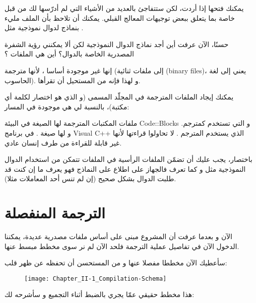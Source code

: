 يمكنك فتحها إذا أردت، لكن ستتفاجئ بالعديد من الأشياء التي لم أدرّسها لك من قبل خاصة بما يتعلق ببعض توجيهات المعالج القبلي. يمكنك أن تلاحظ بأن الملف مليء بنماذج لدوال نموذجية مثل
.

\begin{question}
  حسنًا، الآن عرفت أين أجد نماذج الدوال النموذجية لكن ألا يمكنني رؤية الشفرة المصدرية الخاصة بالدوال؟ أين هي الملفات
؟
\end{question}

إنها غير موجودة أساسا ، لأنها مترجمة (إلى ملفات ثنائية
(\textenglish{binary files})،
يعني إلى لغة الحاسوب). و لهذا فإنه من المستحيل أن تقرأها.

يمكنك إيجاد الملفات المترجمة في المجلّد المسمى
(و الذي هو اختصار لكلمة
أي مكتبة)، بالنسبة لي هي موجودة في المسار:


ملفات المكتبات المترجمة لها الصيغة
في البيئة
\textenglish{Code::Blocks}
و التي تستخدم
كمترجم. و لها صيغة
.
في برنامج
\textenglish{Visual C++}
الذي يستخدم المترجم
.
لا تحاولوا قراءتها لأنها غير قابلة للقراءة من طرف إنسان عادي.

باختصار، يجب عليك أن تضمّن الملفات الرأسية
في الملفات
تتمكن من استخدام الدوال النموذجية مثل
و كما تعرف فالجهاز على اطلاع على النماذج فهو يعرف ما إن كنت قد طلبت الدوال بشكل صحيح (إن لم تنس أحد المعاملات مثلا).

\section{الترجمة المنفصلة}

الآن و بعدما عرفت أن المشروع مبنى على أساس ملفات مصدرية عديدة، يمكننا الدخول الآن في تفاصيل عملية الترجمة فلحد الآن لم نر سوى مخطط مبسط عنها.

سأعطيك الآن مخططا مفصلا عنها و من المستحسن أن تحفظه عن ظهر قلب:

\begin{figure}[H]
	\centering
	\texttt{[image: Chapter\_II-1\_Compilation-Schema]}
\end{figure}

هذا مخطط حقيقي عمّا يجري بالضبط أثناء التجميع و سأشرحه لك:

